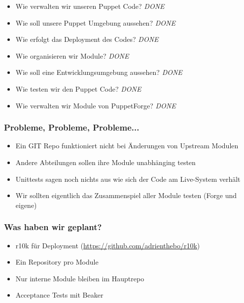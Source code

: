\documentclass{beamer}
\begin{document}
\begin{frame}
  \begin{itemize}
  \item Wie verwalten wir unseren Puppet Code? \emph{\color{green}DONE}
  \item Wie soll unsere Puppet Umgebung aussehen?  \emph{\color{green}DONE}
  \item Wie erfolgt das Deployment des Codes? \emph{\color{green}DONE}
  \item Wie organisieren wir Module? \emph{\color{green}DONE}
  \item Wie soll eine Entwicklungsumgebung aussehen? \emph{\color{green}DONE}
  \item Wie testen wir den Puppet Code? \emph{\color{green}DONE}
  \item Wie verwalten wir Module von PuppetForge? \emph{\color{green}DONE}
  \end{itemize}
\end{frame}


\begin{frame}
  \frametitle{Probleme, Probleme, Probleme...}

  \begin{itemize}
  \item Ein GIT Repo funktioniert nicht bei Änderungen von Upstream Modulen
  \item Andere Abteilungen sollen ihre Module unabhänging testen
  \item Unittests sagen noch nichts aus wie sich der Code am Live-System verhält
  \item Wir sollten eigentlich das Zusammenspiel aller Module testen (Forge und eigene)
  \end{itemize}
\end{frame}

\begin{frame}
  \frametitle{Was haben wir geplant?}

  \begin{itemize}
  \item r10k für Deployment (\url{https://github.com/adrienthebo/r10k})
  \item Ein Repository pro Module
  \item Nur interne Module bleiben im Hauptrepo
  \item Acceptance Tests mit Beaker
  \end{itemize}
\end{frame}
\end{document}
